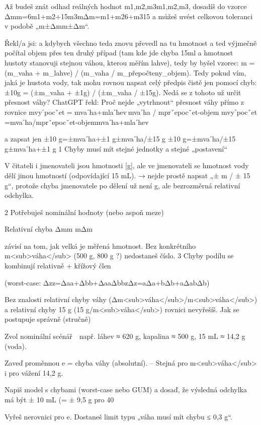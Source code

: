{    Až budeš znát odhad reálných hodnot m1,m2,m3m1​,m2​,m3​, dosadíš do vzorce Δmm=6m1+m2+15m3mΔm​=m1​+m2​6​+m3​15​ a můžeš uvést celkovou toleranci v podobě „m±Δmm±Δm“.

Řekl/a jsi:
 a kdybych všechno teda znovu převedl na tu hmotnost a ted výjmečně počítal objem přes ten druhý případ (tam kde jde chyba 15ml a hmotnost hustoty stanovuji stejnou váhou, kterou měřím lahve), tedy by byšel vzorec: m = (m_vaha + m_lahve) / (m_vaha / m_přepočteny_objem). Tedy pokud vím, jaká je hustota vody, tak mohu rovnou napsat celý předpis čistě jen pomocí chyb: ±10g = (±m_vaha + ±1g) / (±m_vaha / ±15g). Nedá se z tohoto už určit přesnost váhy?
ChatGPT řekl:
Proč nejde „vytrhnout“ přesnost váhy přímo z rovnice
mvyˊpocˇet  =  mvaˊha+mlaˊhev mvaˊha  /  mprˇepocˇet‐objem
mvyˊ​pocˇet​=mvaˊha​/mprˇepocˇet‐objem​mvaˊha​+mlaˊhev​​

a zapsat jen
±10 g=±mvaˊha+±1 g±mvaˊha/±15 g
±10 g=±mvaˊha​/±15 g±mvaˊha​+±1 g​
1 Chyby musí mít stejné jednotky a stejné „postavení“

    V čitateli i jmenovateli jsou hmotnosti [g], ale ve jmenovateli se hmotnost vody dělí jinou hmotností (odpovídající 15 mL).
    → nejde prostě napsat „± m / ± 15 g“, protože chyba jmenovatele po dělení už není g, ale bezrozměrná relativní odchylka.

2 Potřebuješ nominální hodnoty (nebo aspoň meze)

Relativní chyba
Δmm
mΔm​

závisí na tom, jak velká je měřená hmotnost.
Bez konkrétního m<sub>váha</sub> (500 g, 800 g ?) nedostaneš číslo.
3 Chyby podílu se kombinují relativně + křížový člen

(worst-case:
Δzz=Δaa+Δbb+ΔaaΔbbzΔz​=aΔa​+bΔb​+aΔa​bΔb​)

Bez znalosti relativní chyby váhy (Δm<sub>váha</sub>/m<sub>váha</sub>) a relativní chyby 15 g (15 g/m<sub>váha</sub>) rovnici nevyřešíš.
Jak se postupuje správně (stručně)

    Zvol nominální scénář např.
    láhev ≈ 620 g, kapalina ≈ 500 g, 15 mL ≈ 14,2 g (voda).

    Zaveď proměnnou e = chyba váhy (absolutní).
    – Stejná pro m<sub>váha</sub> i pro vážení 14,2 g.

    Napiš model s chybami (worst-case nebo GUM)
    a dosaď, že výsledná odchylka má být ± 10 mL (= ± 9,5 g pro 40 %

    Vyřeš nerovnici pro e.
    Dostaneš limit typu „váha musí mít chybu ≤ 0,3 g“.

}
